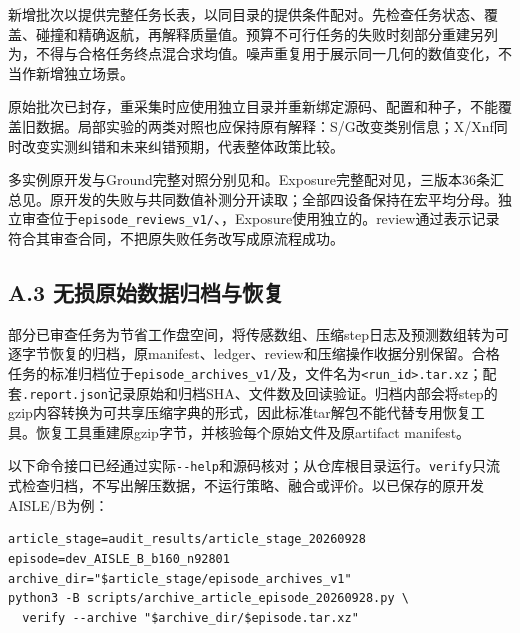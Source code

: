 \documentclass[11pt,a4paper]{article}
\numberwithin{equation}{section}
\begin{document}
新增批次以提供完整任务长表，以同目录的提供条件配对。先检查任务状态、覆盖、碰撞和精确返航，再解释质量值。预算不可行任务的失败时刻部分重建另列为，不得与合格任务终点混合求均值。噪声重复用于展示同一几何的数值变化，不当作新增独立场景。

原始批次已封存，重采集时应使用独立目录并重新绑定源码、配置和种子，不能覆盖旧数据。局部实验的两类对照也应保持原有解释：S/G改变类别信息；X/Xnf同时改变实测纠错和未来纠错预期，代表整体政策比较。

多实例原开发与Ground完整对照分别见和。Exposure完整配对见，三版本36条汇总见。原开发的失败与共同数值补测分开读取；全部四设备保持在宏平均分母。独立审查位于\texttt{episode\_reviews\_v1/}、，Exposure使用独立的。review通过表示记录符合其审查合同，不把原失败任务改写成原流程成功。

\hypertarget{a.3-ux65e0ux635fux539fux59cbux6570ux636eux5f52ux6863ux4e0eux6062ux590d}{%
\subsection*{A.3 无损原始数据归档与恢复}\label{a.3-ux65e0ux635fux539fux59cbux6570ux636eux5f52ux6863ux4e0eux6062ux590d}}

部分已审查任务为节省工作盘空间，将传感数组、压缩step日志及预测数组转为可逐字节恢复的归档，原manifest、ledger、review和压缩操作收据分别保留。合格任务的标准归档位于\texttt{episode\_archives\_v1/}及，文件名为\texttt{\textless{}run\_id\textgreater{}.tar.xz}；配套\texttt{.report.json}记录原始和归档SHA、文件数及回读验证。归档内部会将step的gzip内容转换为可共享压缩字典的形式，因此标准tar解包不能代替专用恢复工具。恢复工具重建原gzip字节，并核验每个原始文件及原artifact manifest。

以下命令接口已经通过实际\texttt{-\/-help}和源码核对；从仓库根目录运行。\texttt{verify}只流式检查归档，不写出解压数据，不运行策略、融合或评价。以已保存的原开发AISLE/B为例：

\par\medskip\noindent\begin{minipage}{\linewidth}
\begin{verbatim}
article_stage=audit_results/article_stage_20260928
episode=dev_AISLE_B_b160_n92801
archive_dir="$article_stage/episode_archives_v1"
python3 -B scripts/archive_article_episode_20260928.py \
  verify --archive "$archive_dir/$episode.tar.xz"
\end{verbatim}
\end{minipage}\par\medskip
\end{document}
